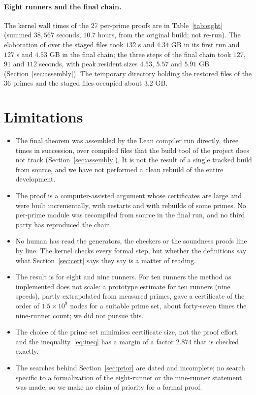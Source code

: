 \documentclass[11pt]{article}
\theoremstyle{remark}
\begin{document}
\paragraph{Eight runners and the final chain.} The kernel wall times of the $27$ per-prime proofs are in Table~\ref{tab:eight} (summed $38{,}567$ seconds, $10.7$ hours, from the original build; not re-run). The elaboration of  over the staged files took $132$ s and $4.34$ GB in its first run and $127$ s and $4.53$ GB in the final chain; the three steps of the final chain took $127$, $91$ and $112$ seconds, with peak resident sizes $4.53$, $5.57$ and $5.91$ GB (Section~\ref{sec:assembly}). The temporary directory holding the restored files of the $36$ primes and the staged files occupied about $3.2$ GB.

\section{Limitations}\label{sec:limits}
\begin{itemize}
\item The final theorem was assembled by the Lean compiler run directly, three times in succession, over compiled files that the build tool of the project does not track (Section~\ref{sec:assembly}). It is not the result of a single tracked build from source, and we have not performed a clean rebuild of the entire development.
\item The proof is a computer-assisted argument whose certificates are large and were built incrementally, with restarts and with rebuilds of some primes. No per-prime module was recompiled from source in the final run, and no third party has reproduced the chain.
\item No human has read the generators, the checkers or the soundness proofs line by line. The kernel checks every formal step, but whether the definitions say what Section~\ref{sec:cert} says they say is a matter of reading.
\item The result is for eight and nine runners. For ten runners the method as implemented does not scale: a prototype estimate for ten runners (nine speeds), partly extrapolated from measured primes, gave a certificate of the order of $1.5\times10^9$ nodes for a suitable prime set, about forty-seven times the nine-runner count; we did not pursue this.
\item The choice of the prime set minimises certificate size, not the proof effort, and the inequality~\eqref{eq:ineq} has a margin of a factor $2.874$ that is checked exactly.
\item The searches behind Section~\ref{sec:prior} are dated and incomplete; no search specific to a formalization of the eight-runner or the nine-runner statement was made, so we make no claim of priority for a formal proof.
\end{itemize}
\end{document}
